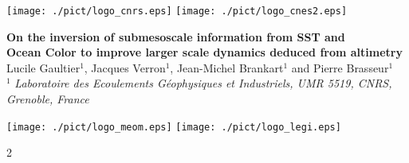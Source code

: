\documentclass[portrait,a0,final]{a0poster}
\newenvironment{poster}{
  \begin{center}
  \begin{minipage}[c]{1.0\textwidth}
}{
  \end{minipage} 
  \end{center}
}
\newenvironment{pcolumn}[1]{
  \begin{minipage}{#1\textwidth}
}{
  \end{minipage}
}
\begin{document}
\begin{poster}
\begin{center}
\begin{pcolumn}{0.98}
\begin{center}
{%
  \begin{minipage}[l][8cm][c]{0.1\textwidth}
  \begin{center}
    \texttt{[image: ./pict/logo\_cnrs.eps]}
    \texttt{[image: ./pict/logo\_cnes2.eps]}
  \end{center}
  \end{minipage}
  \begin{minipage}[c][8cm][c]{0.78\textwidth}
  \begin{center}
    {\sc \huge \bf On the inversion of submesoscale information from SST and \\  
                   \vspace{0.5em}
                   Ocean Color to improve larger scale dynamics deduced from altimetry}\\[10mm]
    {\Large Lucile Gaultier$^{1}$, Jacques Verron$^{1}$, Jean-Michel Brankart$^{1}$ and Pierre Brasseur$^{1}$} \\[5mm]
    {\large {$^{1}$ \it Laboratoire des Ecoulements G\'eophysiques et Industriels, UMR 5519, CNRS, Grenoble, France} %
    } 
  \end{center}
  \end{minipage}
  \begin{minipage}[r][8cm][c]{0.1\textwidth}
  \begin{center}
    \texttt{[image: ./pict/logo\_meom.eps]}
    \texttt{[image: ./pict/logo\_legi.eps]}
  \end{center}
  \end{minipage} 
  }  %
  \end{center}
\end{pcolumn}
\end{center}
 
 
 
\begin{multicols}{2}
 
  \newcommand{\etal}{{\it et al.}}
  \newcommand{\DegN}{$^{\circ}$N~}
  \newcommand{\DegW}{$^{\circ}$W~}
  \newcommand{\DegE}{$^{\circ}$E~}
  \newcommand{\DegS}{$^{\circ}$S~}
  

\end{multicols}
\end{poster}
\end{document}
